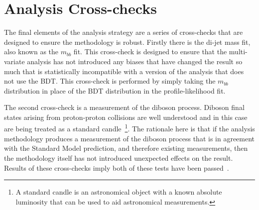 \section{Analysis Cross-checks}

The final elements of the analysis strategy are a series of cross-checks that
are designed to ensure the methodology is robust. Firstly there is the di-jet
mass fit, also known as the $m_{bb}$ fit. This cross-check is designed to ensure
that the multi-variate analysis has not introduced any biases that have changed
the result so much that is statistically incompatible with a version of the
analysis that does not use the BDT. This cross-check is performed by simply
taking the $m_{bb}$ distribution in place of the BDT distribution in the
profile-likelihood fit.

The second cross-check is a measurement of the diboson process. Diboson final
states arising from proton-proton collisions are well understood and in this
case are being treated as a standard candle~\footnote{A standard candle is an
astronomical object with a known absolute luminosity that can be used to aid
astronomical measurements. }. The rationale here is that if the analysis
methodology produces a measurement of the diboson process that is in agreement
with the Standard Model prediction, and therefore existing measurements, then
the methodology itself has not introduced unexpected effects on the result.
Results of these cross-checks imply both of these tests have been
passed~\cite{VHMainNote2019}.


